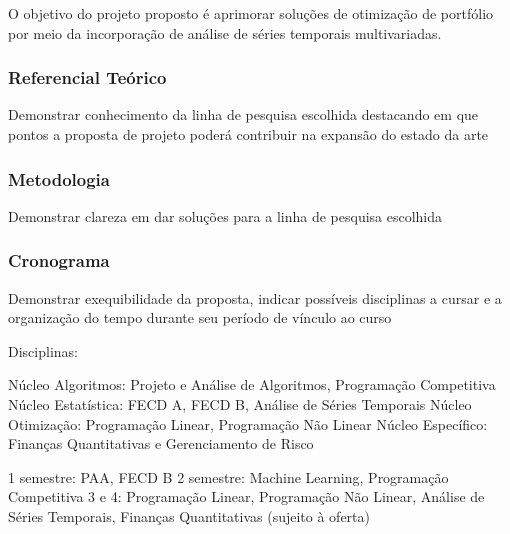 \documentclass[a4paper, 12pt]{article}
\begin{document}
O objetivo do projeto proposto é aprimorar soluções de otimização de portfólio
por meio da incorporação de análise de séries temporais multivariadas.

\subsubsection*{Referencial Teórico}

Demonstrar conhecimento da linha de pesquisa escolhida destacando em que
pontos a proposta de projeto poderá contribuir na expansão do estado da arte

\subsubsection*{Metodologia}

Demonstrar clareza em dar soluções para a linha de pesquisa escolhida

\subsubsection*{Cronograma}

Demonstrar exequibilidade da proposta, indicar possíveis disciplinas a cursar
e a organização do tempo durante seu período de vínculo ao curso

Disciplinas:

Núcleo Algoritmos: Projeto e Análise de Algoritmos, Programação Competitiva
Núcleo Estatística: FECD A, FECD B, Análise de Séries Temporais
Núcleo Otimização: Programação Linear, Programação Não Linear
Núcleo Específico: Finanças Quantitativas e Gerenciamento de Risco

1 semestre: PAA, FECD B
2 semestre: Machine Learning, Programação Competitiva
3 e 4: Programação Linear, Programação Não Linear, Análise de Séries Temporais,
Finanças Quantitativas (sujeito à oferta)



\end{document}
